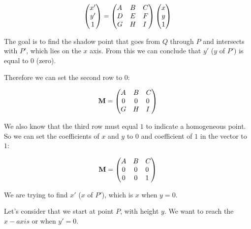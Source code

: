 \documentclass[12pt]{article}
\begin{document}
\begin{align}
\begin{pmatrix}
x' \\
y' \\
1  
\end{pmatrix} \nonumber
&=
\begin{pmatrix}
A \hfill & B & C \\
D & E & F \hfill \\
G & H & I \hfill 
\end{pmatrix} \nonumber
\begin{pmatrix}
x \\
y \\
1  
\end{pmatrix} \nonumber \\
\end{align}


The goal is to find the shadow point that goes from $Q$ through $P$ 
and intersects with $P'$, which lies on the $x$ axis. 
From this we can conclude that $y'$ ($y$ of $P'$) is equal to 0 (zero).

Therefore we can set the second row to $0$:

\begin{align}
\textbf{M} &=
\begin{pmatrix}
A \hfill & B & C \\
0 & 0 & 0 \hfill \\
G & H & I \hfill 
\end{pmatrix} \nonumber \\
\end{align}

We also know that the third row must equal $1$ to indicate a homogeneous point.
So we can set the coefficients of $x$ and $y$ to $0$ and coefficient of $1$ in the vector to $1$:

\begin{align}
\textbf{M} &=
\begin{pmatrix}
A \hfill & B & C \\
0 & 0 & 0 \hfill \\
0 & 0 & 1 \hfill 
\end{pmatrix} \nonumber \\
\end{align}

We are trying to find $x'$ ($x$ of $P'$), which is $x$ when $y = 0$.

Let's consider that we start at point $P$, with height $y$. 
We want to reach the $x-axis$ or when $y' = 0$.
\end{document}
